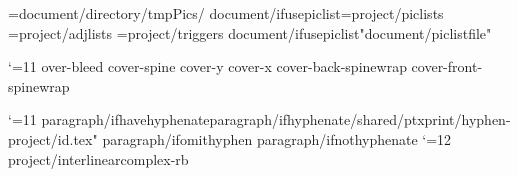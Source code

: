 
\PicPath={{{document/directory}/tmpPics/}}
{document/ifusepiclist}\PicListPath={{{project/piclists}}}
\AdjListPath={{{project/adjlists}}}
\TrigListPath={{{project/triggers}}}
{document/ifusepiclist}\openpiclist "{document/piclistfile}"

\catcode`\@=11
\def\tmp{{{cover/coverartbleed}mm}}   %
\expandafter\edef\csname cover-bleed   %
\expandafter\edef\csname cover-spine   %
\expandafter\xdef\csname cover-y\endcsname{{\the\PaperHeight}} %
\expandafter\xdef\csname cover-x\endcsname{{\the\PaperWidth}} %
\expandafter\edef\csname cover-back-spinewrap %
\expandafter\edef\csname cover-front-spinewrap %

\newlanguage\langund \language\langund
\catcode`\@=11
{paragraph/ifhavehyphenate}{paragraph/ifhyphenate}\bgroup{}/shared/ptxprint/hyphen-{project/id}.tex" \egroup
{paragraph/ifomithyphen} %
{paragraph/ifnothyphenate} 
\catcode`\@=12
\let\pb=\pagebreak
{project/interlinear}\expandafter\def\csname complex-rb




